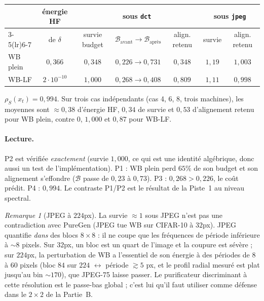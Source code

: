 \documentclass[11pt,a4paper]{article}
\theoremstyle{plain}
\theoremstyle{definition}
\theoremstyle{remark}
\newtheorem{remark}[theorem]{Remarque}
\newcommand{\B}{\mathcal{B}}
\newcommand{\xt}{x_t}
\begin{document}
\begin{center}
\begin{tabular}{lcccccc}
\toprule
 & énergie HF & \multicolumn{3}{c}{sous \texttt{dct}} & \multicolumn{2}{c}{sous \texttt{jpeg}}\\
\cmidrule(lr){3-5}\cmidrule(lr){6-7}
 & de $\delta$ & survie budget & $\B_{\text{avant}}\to\B_{\text{après}}$ & align. retenu & survie & align. retenu\\
\midrule
WB plein & $0{,}366$ & $0{,}348$ & $0{,}226\to0{,}731$ & $0{,}348$ & $1{,}19$ & $1{,}003$\\
WB-LF    & $2\cdot10^{-10}$ & $1{,}000$ & $0{,}268\to0{,}408$ & $0{,}809$ & $1{,}11$ & $0{,}998$\\
\bottomrule
\end{tabular}
\end{center}
$\rho_S(\xt)=0{,}994$. Sur trois cas indépendants (cas 4, 6, 8, trois machines), les moyennes sont
$\approx0{,}38$ d'énergie HF, $0{,}34$ de survie et $0{,}53$ d'alignement retenu pour WB plein,
contre $0$, $1{,}000$ et $0{,}87$ pour WB-LF.

\paragraph{Lecture.} P2 est vérifiée \emph{exactement} (survie $1{,}000$, ce qui est une identité
algébrique, donc aussi un test de l'implémentation). P1 : WB plein perd $65\%$ de son budget et
son alignement s'effondre ($\B$ passe de $0{,}23$ à $0{,}73$). P3 : $0{,}268>0{,}226$, le coût
prédit. P4 : $0{,}994$. Le contraste P1/P2 est le résultat de la Piste~1 au niveau spectral.

\begin{remark}[JPEG à $224$px]\label{rem:jpeg224}
La survie $\approx1$ sous JPEG n'est pas une contradiction avec PureGen (JPEG tue WB sur
CIFAR-10 à $32$px). JPEG quantifie \emph{dans} des blocs $8\times8$ : il ne coupe que les
fréquences de période inférieure à $\sim8$ pixels. Sur $32$px, un bloc est un quart de l'image et
la coupure est sévère ; sur $224$px, la perturbation de WB a l'essentiel de son énergie à des
périodes de $8$ à $60$ pixels (bloc $84$ sur $224$ $\leftrightarrow$ période $\gtrsim5$ px, et le
profil radial mesuré est plat jusqu'au bin $\sim170$), que JPEG-75 laisse passer. Le purificateur
discriminant à cette résolution est le passe-bas global ; c'est lui qu'il faut utiliser comme
défense dans le $2\times2$ de la Partie~B.
\end{remark}
\end{document}
